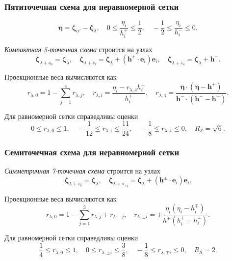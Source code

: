 \documentclass[mathserif]{beamer} %
\newcommand{\bzeta}{\boldsymbol{\zeta}}
\newcommand{\bh}{\boldsymbol{h}}
\newcommand{\be}{\boldsymbol{e}}
\begin{document}
\begin{frame}
    \frametitle{Пятиточечная схема для неравномерной сетки}
    \begin{equation}\label{eq:eta_definition}
        \boldsymbol{\eta} = \bzeta_{\alpha'} - \bzeta_{\lambda}, \quad
        0 \leq \frac{\eta_i}{h^+_i} \leq \frac12, \quad
        -\frac12 \leq \frac{\eta_i}{h^-_i} \leq 0.
    \end{equation}\pause

    \emph{Компактная 5-точечная схема} строится на узлах
    \begin{equation}\label{eq:stencil_nodes_5}
        \bzeta_{\lambda+s_0} = \bzeta_{\lambda}, \quad
        \bzeta_{\lambda+s_i} = \bzeta_{\lambda} + (\bh^+\cdot \be_i)\be_i, \quad
        \bzeta_{\lambda+s_4} = \bzeta_{\lambda} + \bh^-.
    \end{equation}

    Проекционные веса вычисляются как
    \begin{equation}\label{eq:stencil_weights_5}
        r_{\lambda,0} = 1 - \sum_{j=1}^4 r_{\lambda,j}, \quad
        r_{\lambda,i} = \frac{\eta_i - r_{\lambda,4}h^-_i}{h^+_i}, \quad
        r_{\lambda,4} = \frac{\boldsymbol{\eta}\cdot(\boldsymbol{\eta} - \bh^+)}
            {\bh^-\cdot(\bh^- - \bh^+)}.
    \end{equation}
    \vspace{-20pt}\pause

    Для равномерной сетки справедливы оценки
    \begin{equation}\label{eq:weights_ranges_5}
        0 \leq r_{\lambda,0} \leq 1, \quad
        -\frac1{12} \leq r_{\lambda,i} \leq \frac{11}{24}, \quad
        -\frac18 \leq r_{\lambda,4} \leq 0, \quad
        R_\mathcal{S} = \sqrt{6}.
    \end{equation}
\end{frame}

\begin{frame}
    \frametitle{Семиточечная схема для неравномерной сетки}
    \emph{Симметричная 7-точечная схема} строится на узлах
    \begin{equation}\label{eq:stencil_nodes_7}
        \bzeta_{\lambda+s_0} = \bzeta_{\lambda}, \quad
        \bzeta_{\lambda+s_{\pm i}} = \bzeta_{\lambda} + (\bh^\pm\cdot \be_i)\be_i.
    \end{equation}

    Проекционные веса вычисляются как
    \begin{equation}\label{eq:stencil_weights_7}
        r_{\lambda,0} = 1 - \sum_{j=1}^3 r_{\lambda,j} + r_{\lambda,-j}, \quad
        r_{\lambda,\pm i} = \pm\frac{\eta_i(\eta_i - h^\mp_i)}{h^\pm(h^+_i-h^-_i)}.
    \end{equation}
    \pause

    Для равномерной сетки справедливы оценки
    \begin{equation}\label{eq:weights_ranges_7}
        \frac14 \leq r_{\lambda,0} \leq 1, \quad
        0 \leq r_{\lambda,\pm i} \leq \frac38, \quad
        -\frac18 \leq r_{\lambda,\mp i} \leq 0, \quad
        R_\mathcal{S} = 2.
    \end{equation}
\end{frame}
\end{document}
